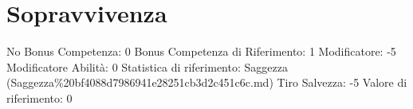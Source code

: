 \section{Sopravvivenza}\label{sopravvivenza}

\begin{description}
\tightlist
\item[Tags: ABI]
No Bonus Competenza: 0 Bonus Competenza di Riferimento: 1 Modificatore:
-5 Modificatore Abilità: 0 Statistica di riferimento: Saggezza
(Saggezza\%20bf4088d7986941e28251cb3d2c451c6c.md) Tiro Salvezza: -5
Valore di riferimento: 0
\end{description}
